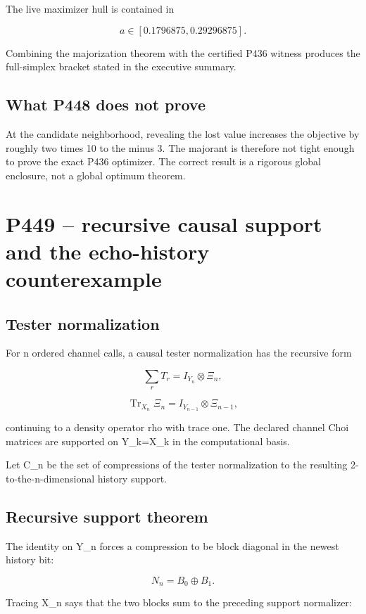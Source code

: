 \documentclass[11pt,a4paper,openany]{report}
\begin{document}
The live maximizer hull is contained in

\[
a\in[0.1796875,0.29296875].
\]

Combining the majorization theorem with the certified P436 witness produces the full-simplex bracket stated in the executive summary.

\section{What P448 does not prove}

At the candidate neighborhood, revealing the lost value increases the objective by roughly two times 10 to the minus 3. The majorant is therefore not tight enough to prove the exact P436 optimizer. The correct result is a rigorous global enclosure, not a global optimum theorem.

\chapter{P449 -- recursive causal support and the echo-history counterexample}

\section{Tester normalization}

For n ordered channel calls, a causal tester normalization has the recursive form

\[
\sum_rT_r=I_{Y_n}\otimes\Xi_n,
\]

\[
\operatorname{Tr}_{X_n}\Xi_n
=I_{Y_{n-1}}\otimes\Xi_{n-1},
\]

continuing to a density operator rho with trace one. The declared channel Choi matrices are supported on Y\_k=X\_k in the computational basis.

Let C\_n be the set of compressions of the tester normalization to the resulting 2-to-the-n-dimensional history support.

\section{Recursive support theorem}

The identity on Y\_n forces a compression to be block diagonal in the newest history bit:

\[
N_n=B_0\oplus B_1.
\]

Tracing X\_n says that the two blocks sum to the preceding support normalizer:
\end{document}
